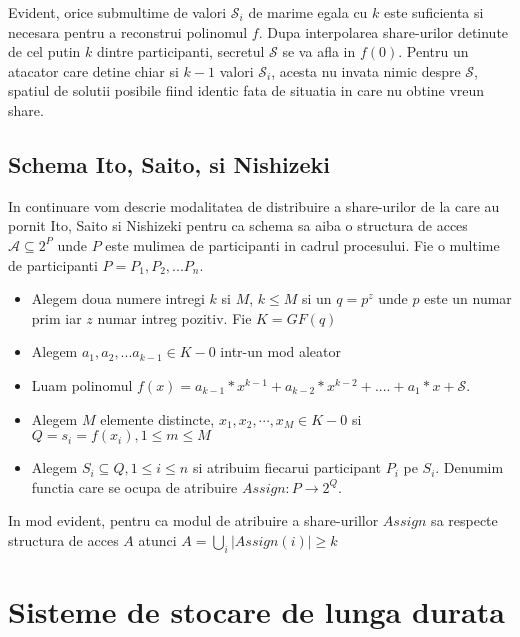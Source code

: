 \documentclass{llncs}
\begin{document}
Evident, orice submultime de valori $\mathcal{S}_i$ de marime egala cu $k$ este suficienta si necesara pentru a reconstrui polinomul $f$. Dupa interpolarea share-urilor detinute de cel putin $k$ dintre participanti, secretul $\mathcal{S}$ se va afla in $f(0)$. Pentru un atacator care detine chiar si $k-1$ valori $\mathcal{S}_i$, acesta nu invata nimic despre $\mathcal{S}$, spatiul de solutii posibile fiind identic fata de situatia in care nu obtine vreun share.

\subsection{Schema Ito, Saito, si Nishizeki}
\label{Ito}

In continuare vom descrie modalitatea de distribuire a share-urilor de la care au pornit Ito, Saito si Nishizeki pentru ca schema sa aiba o structura de acces $\mathcal{A} \subseteq 2^P$ unde $P$ este mulimea de participanti in cadrul procesului.
Fie o multime de participanti $P = {P_1, P_2, ... P_n}$. 
\begin{itemize}
	\item Alegem doua numere intregi $k$ si $M$, $k \leq M$ si un $q = p^z$ unde $p$ este un numar prim iar $z$ numar intreg pozitiv. Fie $K = GF(q)$
	\item Alegem $a_1, a_2, ...a_{k-1} \in K - {0}$ intr-un mod aleator
	\item Luam polinomul $f(x) = a_{k-1} * x ^ {k-1} + a_{k-2} * x ^ {k - 2} + .... + a_1 * x + \mathcal{S}$.
	\item Alegem $M$ elemente distincte, $x_1, x_2, \cdots, x_M \in K - {0}$ si $Q = {s_i = f(x_i), 1 \leq m \leq M}$
	\item Alegem $S_i \subseteq Q, 1 \leq i \leq n$ si atribuim fiecarui participant $P_i$ pe $S_i$.
	Denumim functia care se ocupa de atribuire $Assign: P \rightarrow 2^Q$. \cite{ITO:1989}
\end{itemize}
In mod evident, pentru ca modul de atribuire a share-urillor $Assign$ sa respecte structura de acces $A$ atunci
$A = { \underset{i}{{\bigcup}} } |Assign(i)| \geq k$


\section{Sisteme de stocare de lunga durata}
\end{document}

